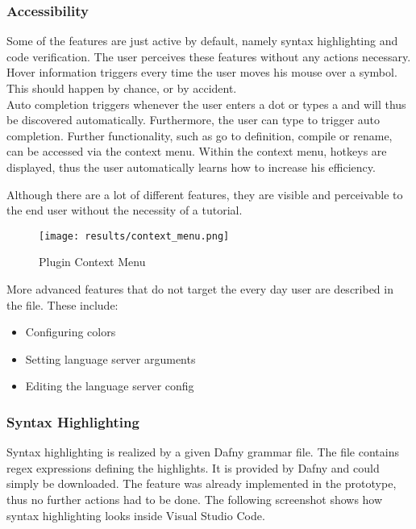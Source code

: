 \subsubsection{Accessibility}
Some of the features are just active by default, namely syntax highlighting and code verification.
The user perceives these features without any actions necessary.\\

Hover information triggers every time the user moves his mouse over a symbol.
This should happen by chance, or by accident.\\

Auto completion triggers whenever the user enters a dot or types a  and will thus be discovered automatically. 
Furthermore, the user can type  to trigger auto completion.
Further functionality, such as go to definition, compile or rename, can be accessed via the context menu.
Within the context menu, hotkeys are displayed, thus the user automatically learns how to increase his efficiency.

Although there are a lot of different features, they are visible and perceivable to the end user without the necessity of a tutorial.

\begin{figure}[H]
    \centering
    \texttt{[image: results/context\_menu.png]}
    \caption{Plugin Context Menu}
    \label{fig:result_contextmenu}
\end{figure}

More advanced features that do not target the every day user are described in the  file.
These include:
\begin{itemize}
    \item Configuring colors
    \item Setting language server arguments
    \item Editing the language server config
\end{itemize}

\subsubsection{Syntax Highlighting}
\label{section:result:syntaxhighgliht}
Syntax highlighting is realized by a given Dafny grammar file.
The file contains regex expressions defining the highlights.
It is provided by Dafny  and could simply be downloaded.
The feature was already implemented in the prototype, thus no further actions had to be done.
The following screenshot shows how syntax highlighting looks inside Visual Studio Code.

